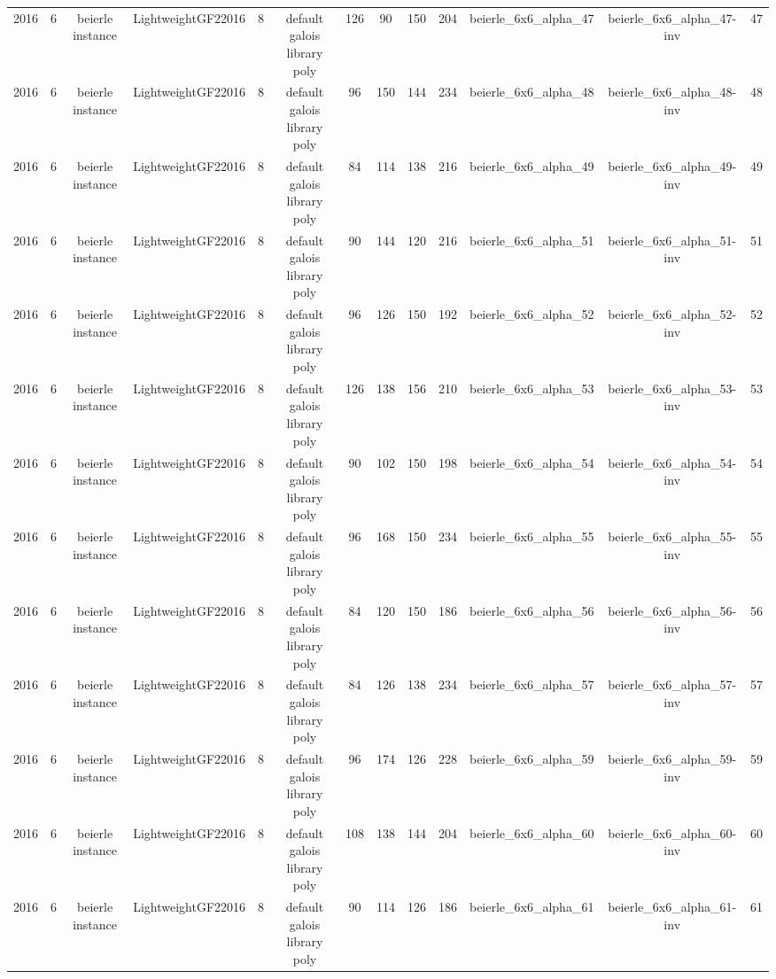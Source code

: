 \begin{tabular}{c c c c c c c c c c c c c}
2016 & 6 & beierle instance & LightweightGF22016 & 8 & default galois library poly & 126 & 90 & 150 & 204 & beierle_6x6_alpha_47 & beierle_6x6_alpha_47-inv & 47 \\
2016 & 6 & beierle instance & LightweightGF22016 & 8 & default galois library poly & 96 & 150 & 144 & 234 & beierle_6x6_alpha_48 & beierle_6x6_alpha_48-inv & 48 \\
2016 & 6 & beierle instance & LightweightGF22016 & 8 & default galois library poly & 84 & 114 & 138 & 216 & beierle_6x6_alpha_49 & beierle_6x6_alpha_49-inv & 49 \\
2016 & 6 & beierle instance & LightweightGF22016 & 8 & default galois library poly & 90 & 144 & 120 & 216 & beierle_6x6_alpha_51 & beierle_6x6_alpha_51-inv & 51 \\
2016 & 6 & beierle instance & LightweightGF22016 & 8 & default galois library poly & 96 & 126 & 150 & 192 & beierle_6x6_alpha_52 & beierle_6x6_alpha_52-inv & 52 \\
2016 & 6 & beierle instance & LightweightGF22016 & 8 & default galois library poly & 126 & 138 & 156 & 210 & beierle_6x6_alpha_53 & beierle_6x6_alpha_53-inv & 53 \\
2016 & 6 & beierle instance & LightweightGF22016 & 8 & default galois library poly & 90 & 102 & 150 & 198 & beierle_6x6_alpha_54 & beierle_6x6_alpha_54-inv & 54 \\
2016 & 6 & beierle instance & LightweightGF22016 & 8 & default galois library poly & 96 & 168 & 150 & 234 & beierle_6x6_alpha_55 & beierle_6x6_alpha_55-inv & 55 \\
2016 & 6 & beierle instance & LightweightGF22016 & 8 & default galois library poly & 84 & 120 & 150 & 186 & beierle_6x6_alpha_56 & beierle_6x6_alpha_56-inv & 56 \\
2016 & 6 & beierle instance & LightweightGF22016 & 8 & default galois library poly & 84 & 126 & 138 & 234 & beierle_6x6_alpha_57 & beierle_6x6_alpha_57-inv & 57 \\
2016 & 6 & beierle instance & LightweightGF22016 & 8 & default galois library poly & 96 & 174 & 126 & 228 & beierle_6x6_alpha_59 & beierle_6x6_alpha_59-inv & 59 \\
2016 & 6 & beierle instance & LightweightGF22016 & 8 & default galois library poly & 108 & 138 & 144 & 204 & beierle_6x6_alpha_60 & beierle_6x6_alpha_60-inv & 60 \\
2016 & 6 & beierle instance & LightweightGF22016 & 8 & default galois library poly & 90 & 114 & 126 & 186 & beierle_6x6_alpha_61 & beierle_6x6_alpha_61-inv & 61 \\

\end{tabular}
